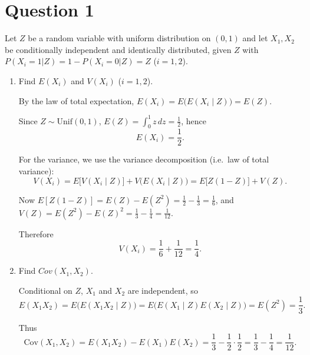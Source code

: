 \documentclass[dvipsnames,11pt]{article}
\begin{document}
\section*{Question 1}

    Let $Z$ be a random variable with uniform distribution on $(0,1)$ and let $X_1,X_2$ be conditionally independent and identically distributed, given $Z$ with $P(X_i=1|Z)=1-P(X_i=0|Z)=Z$ ($i=1,2$).

    \begin{enumerate}[label=\alph*.]
        \item Find $E(X_i )$ and $V (X_i )$ ($i=1,2$).
    
            \begin{solution}
    
                By the law of total expectation, $E(X_i)=E\big(E(X_i\mid Z)\big)=E(Z)$.
                
                Since $Z\sim \mathrm{Unif}(0,1)$, $E(Z)=\int_0^1 z\,dz=\tfrac12$, hence
                \[
                E(X_i)=\frac12.
                \]
                
                For the variance, we use the variance decomposition (i.e.\ law of total variance):
                \[
                V(X_i)=E\!\big[V(X_i\mid Z)\big]+V\!\big(E(X_i\mid Z)\big)
                =E\!\big[Z(1-Z)\big]+V(Z).
                \]
                
                Now $E[Z(1-Z)]=E(Z)-E(Z^2)=\tfrac12-\tfrac13=\tfrac16$, and
                $V(Z)=E(Z^2)-E(Z)^2=\tfrac13-\tfrac14=\tfrac1{12}$. 
                
                Therefore
                \[
                V(X_i)=\frac16+\frac1{12}=\frac14.
                \]                
                
            \end{solution}
            
        \item Find $Cov(X_1 , X_2 )$.
    
            \begin{solution}
    
                Conditional on $Z$, $X_1$ and $X_2$ are independent, so
                \[
                E(X_1X_2)=E\!\big(E(X_1X_2\mid Z)\big)=E\!\big(E(X_1\mid Z)E(X_2\mid Z)\big)=E(Z^2)=\frac13.
                \]
                
                Thus
                \[
                \mathrm{Cov}(X_1,X_2)=E(X_1X_2)-E(X_1)E(X_2)=\frac13-\frac12\cdot\frac12=\frac13-\frac14=\frac1{12}.
                \]
                

\end{solution}
\end{enumerate}
\end{document}
